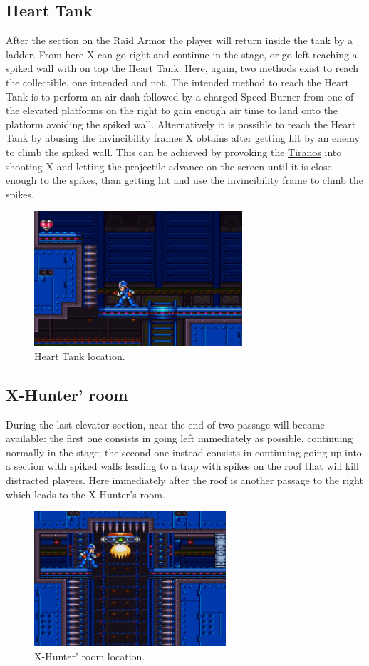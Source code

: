 \subsection{Heart Tank}
After the section on the Raid Armor the player will return inside the tank by a ladder. From here X can go right and continue in the stage, or go left reaching a spiked wall with on top the Heart Tank. Here, again, two methods exist to reach the collectible, one intended and not. The intended method to reach the Heart Tank is to perform an air dash followed by a charged Speed Burner from one of the elevated platforms on the right to gain enough air time to land onto the platform avoiding the spiked wall. Alternatively it is possible to reach the Heart Tank by abusing the invincibility frames X obtains after getting hit by an enemy to climb the spiked wall. This can be achieved by provoking the \hyperlink {enem:Tiranos}{Tiranos} into shooting X and letting the projectile advance on the screen until it is close enough to the spikes, than getting hit and use the invincibility frame to climb the spikes.
\begin{figure}[htp]
	\centering
	\includegraphics[height=5cm]{figures/X2/Wheel_gator/Gator_heart.png}
	\caption{Heart Tank location.}
\end{figure}

\subsection{X-Hunter' room}
During the last elevator section, near the end of two passage will became available: the first one consists in going left immediately as possible, continuing normally in the stage; the second one instead consists in continuing going up into a section with spiked walls leading to a trap with spikes on the roof that will kill distracted players. Here immediately after the roof is another passage to the right which leads to the X-Hunter's room.
\begin{figure}[htp]
	\centering
	\includegraphics[height=5cm]{figures/X2/Wheel_gator/Gator_Hunter_room.png}
	\caption{X-Hunter' room location.}
\end{figure}

